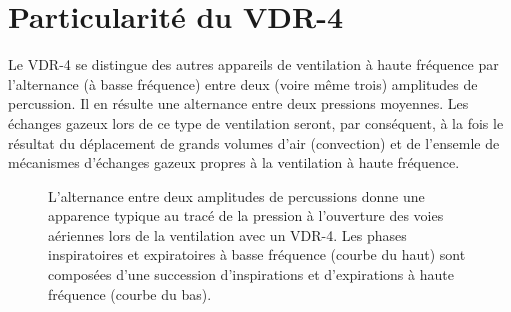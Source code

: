 \section{Particularité du VDR-4}
\label{sec:particularite}
Le VDR-4 se distingue des autres appareils de ventilation à haute fréquence par
l'alternance (à basse fréquence) entre deux (voire même trois) amplitudes de
percussion. Il en résulte une alternance entre deux pressions moyennes. Les
échanges gazeux lors de ce type de ventilation seront, par conséquent, à la
fois le résultat du déplacement de grands volumes d'air (convection) et de
l'ensemle de mécanismes d'échanges gazeux propres à la ventilation à haute
fréquence.

\begin{figure}[h]
	
	\caption{L'alternance entre deux amplitudes de percussions donne une apparence typique au tracé de la pression à l'ouverture des voies aériennes lors de la ventilation avec un VDR-4. Les phases inspiratoires et expiratoires à basse fréquence (courbe du haut) sont composées d'une succession d'inspirations et d'expirations à haute fréquence (courbe du bas).}
\end{figure}
